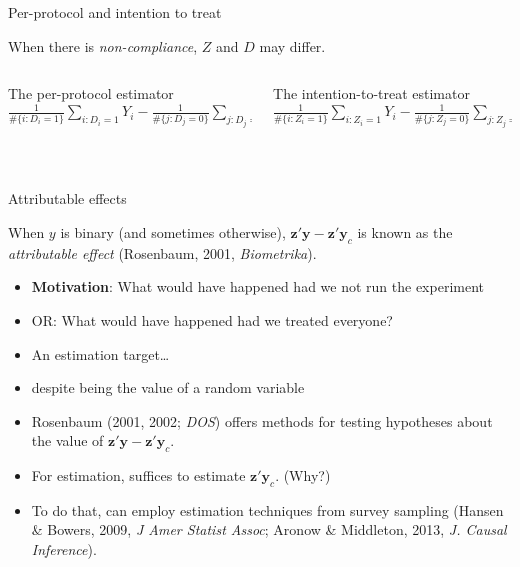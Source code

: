 \begin{frame}{Per-protocol and intention to treat}

When there is \textit{non-compliance}, $Z$ and $D$ may differ.  \pause  

  \begin{columns}
    \begin{Column}
  { The per-protocol estimator} \\      
$\frac{1}{\# \{i: D_i = 1\}} \sum_{i:D_i=1} Y_i - \frac{1}{\# \{j: D_j = 0\}} \sum_{j:D_j=0} Y_j$
\bigskip

\vspace{.5\textheight} 
\mbox{ }

    \end{Column}
    \begin{Column}
  { The intention-to-treat estimator} \\      
$\frac{1}{\# \{i: Z_i = 1\}} \sum_{i:Z_i=1} Y_i - \frac{1}{\# \{j: Z_j = 0\}} \sum_{j:Z_j=0} Y_j$
\bigskip


\vspace{.5\textheight} 
\mbox{ }
    \end{Column}

  \end{columns}
\end{frame}

\begin{frame}{Attributable effects}
  
When $y$ is binary (and sometimes otherwise), $\mathbf{z}'\mathbf{y} - \mathbf{z}'\mathbf{y}_{c}$ is known as the \textit{attributable effect} (Rosenbaum, 2001, \textit{Biometrika}).
\begin{itemize}
\item \textbf{Motivation}: What would have happened had we not run the experiment
\item OR: What would have happened had we treated everyone? 
\item An estimation target\ldots
\item despite being the value of a random variable
\item Rosenbaum (2001, 2002; \textit{DOS}) offers methods for testing hypotheses about the value of $\mathbf{z}'\mathbf{y} - \mathbf{z}'\mathbf{y}_{c}$.
\item<2-> For estimation, suffices to estimate $\mathbf{z}'\mathbf{y}_{c}$. (Why?)
\item<2-> To do that, can employ estimation techniques from survey sampling (Hansen \& Bowers, 2009, \textit{J Amer Statist Assoc}; Aronow \& Middleton, 2013, \textit{J. Causal Inference}).
\end{itemize}


\end{frame}



